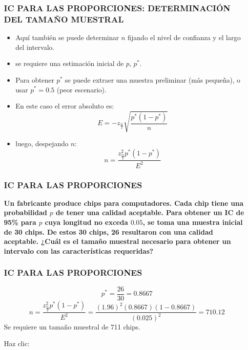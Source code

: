\documentclass{beamer}
\begin{document}
\begin{frame}
\frametitle{IC PARA LAS PROPORCIONES: DETERMINACIÓN DEL TAMAÑO
MUESTRAL}

\begin{itemize}
\item Aquí también se puede determinar $n$ fijando el nivel de
confianza y el largo del intervalo.
\item se requiere una estimación inicial de $p$, $p^*$.
\item Para obtener $p^*$ se puede extraer una muestra preliminar (más
pequeña), o usar $p^*=0.5$ (peor escenario).
\item En este caso el error absoluto es:
$$E=-z_{\frac{\alpha}{2}}\sqrt{\frac{p^*(1-p^*)}{n}}$$
\item luego, despejando $n$:
$$n=\frac{z_{\frac{\alpha}{2}}^2p^*(1-p^*)}{E^2}$$
\end{itemize}
\end{frame}




\begin{frame}
\frametitle{IC PARA LAS PROPORCIONES }

\textbf{Un fabricante produce chips para computadores. Cada chip tiene una
probabilidad $p$ de tener una calidad aceptable. Para obtener un IC
de 95\% para $p$ cuya longitud no exceda $0.05$, se toma una muestra
inicial de 30 chips. De estos 30 chips, 26 resultaron con una
calidad aceptable. ¿Cuál es el tamaño muestral necesario para
obtener un intervalo con las características requeridas?}
\end{frame}



\begin{frame}
\frametitle{IC PARA LAS PROPORCIONES}
$$p^*=\frac{26}{30}=0.8667$$
$$n=\frac{z_{\frac{\alpha}{2}}^2p^*(1-p^*)}{E^2}=\frac{(1.96)^2(0.8667)(1-0.8667)}{(0.025)^2}=710.12$$
Se requiere un tamaño muestral de 711 chips.

      Haz clic: \href{https://colab.research.google.com/drive/14izMe-eFdclOhTeS3hiLE_0h_4E3Jkps?usp=sharing}{} \href{https://docs.google.com/spreadsheets/d/1xAh-TitIncHH8uwblbpvgjYma7B6gUTWlk8C2z1BquQ/edit?usp=sharing}{}
\end{frame}
\end{document}
